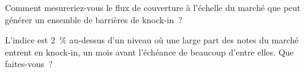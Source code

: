 \begin{interviewq}\label{iq:dv:autocallables:5}
Comment mesureriez-vous le flux de couverture à l'échelle du marché que peut générer un ensemble de barrières de knock-in~?
\end{interviewq}

\begin{interviewq}\label{iq:dv:autocallables:6}
L'indice est 2~\% au-dessus d'un niveau où une large part des notes du marché entrent en knock-in, un mois avant l'échéance de beaucoup
d'entre elles. Que faites-vous~?
\end{interviewq}
